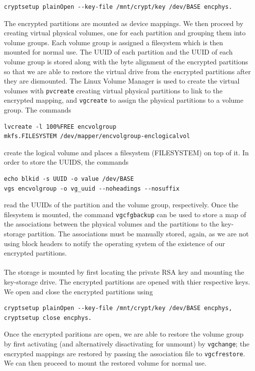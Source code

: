 \documentclass[12pt]{article}
\begin{document}
\begin{verbatim}
cryptsetup plainOpen --key-file /mnt/crypt/key /dev/BASE encphys.
\end{verbatim}
The encrypted partitions are mounted as device mappings. We then proceed by creating virtual physical volumes, one for each partition and grouping them into volume groups. Each volume group is assigned a filesystem which is then mounted for normal use. The UUID of each partition and the UUID of each volume group is stored along with the byte alignment of the encrypted partitions so that we are able to restore the virtual drive from the encrypted partitions after they are dismounted. The Linux Volume Manager is used to create the virtual volumes with \verb|pvcreate| creating virtual physical partitions to link to the encrypted mapping, and \verb|vgcreate| to assign the physical partitions to a volume group. The commands
\begin{verbatim}
lvcreate -l 100%FREE encvolgroup
mkfs.FILESYSTEM /dev/mapper/encvolgroup-enclogicalvol
\end{verbatim}
create the logical volume and places a filesystem (FILESYSTEM) on top of it. In order to store the UUIDS, the commands
\begin{verbatim}
echo blkid -s UUID -o value /dev/BASE
vgs encvolgroup -o vg_uuid --noheadings --nosuffix
\end{verbatim}
read the UUIDs of the partition and the volume group, respectively. Once the filesystem is mounted, the command \verb|vgcfgbackup|
can be used to store a map of the associations between the physical volumes and the partitions to the key-storage partition. The associations must be manually stored, again, as we are not using block headers to notify the operating system of the existence of our encrypted partitions.
~\\~\\
The storage is mounted by first locating the private RSA key and mounting the key-storage drive. The encrypted partitions are opened with thier respective keys.  We open and close the encrypted partitions using
\begin{verbatim}
cryptsetup plainOpen --key-file /mnt/crypt/key /dev/BASE encphys,
cryptsetup close encphys.
\end{verbatim}
Once the encrypted paritions are open, we are able to restore the volume group by first activating (and alternatively disactivating for unmount) by \verb|vgchange|; the encrypted mappings are restored by passing the association file to \verb|vgcfrestore|. We can then proceed to mount the restored volume for normal use.
\end{document}
